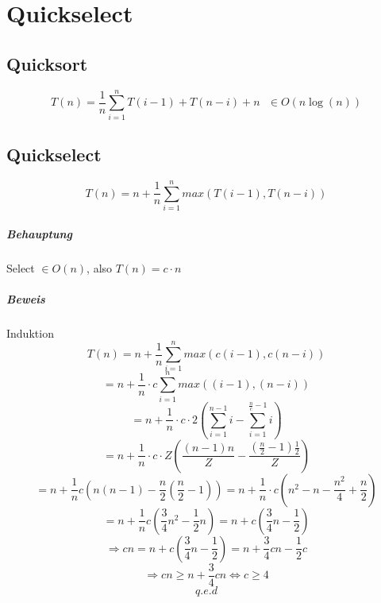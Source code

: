\chapter{Quickselect}

\section{Quicksort}
\[T\left(n \right)= \frac{1}{n} \sum_{i=1}^n T\left(i-1 \right) + T\left(n-i \right) + n ~~~\in O\left(n\log\left(n \right) \right)\] 

\section{Quickselect}
\[T\left(n \right) = n+\frac{1}{n} \sum_{i=1}^{n} max\left(T\left(i-1 \right), T\left(n-i \right) \right)\]

\paragraph{Behauptung} Select $\in O\left(n \right)$, also $T\left(n \right) = c \cdot n$
\paragraph{Beweis} Induktion
\[T\left(n \right)=n+\frac{1}{n} \sum_{i=1}^n max\left(c\left(i-1 \right), c\left(n-i \right) \right)\]
\[=n+\frac{1}{n} \cdot c \sum_{i=1}^n max\left(\left(i-1 \right), \left(n-i \right) \right)\]
\[=n+\frac{1}{n} \cdot c \cdot 2 \left(\sum_{i=1}^{n-1} i  -  \sum_{i=1}^{\frac{n}{c}-1} i  \right)\]
\[=n+\frac{1}{n} \cdot c \cdot Z \left(\frac{\left(n-1 \right)n}{Z} - \frac{\left(\frac{n}{2}-1 \right)\frac{1}{2}}{Z} \right)\]
\[=n+\frac{1}{n}c\left(n\left(n-1 \right)-\frac{n}{2}\left(\frac{n}{2}-1 \right) \right) = n + \frac{1}{n}\cdot c \left(n^2-n-\frac{n^2}{4}+\frac{n}{2} \right)\]
\[=n + \frac{1}{n} c \left(\frac{3}{4} n^2 - \frac{1}{2}n \right) = n + c\left( \frac{3}{4} n - \frac{1}{2} \right)\]
\[\Rightarrow cn = n+c\left(\frac{3}{4}n-\frac{1}{2} \right) = n+\frac{3}{4}cn-\frac{1}{2}c\]
\[\Rightarrow cn \geq n + \frac{3}{4} cn \Leftrightarrow c \geq 4 \]
\[q.e.d\]